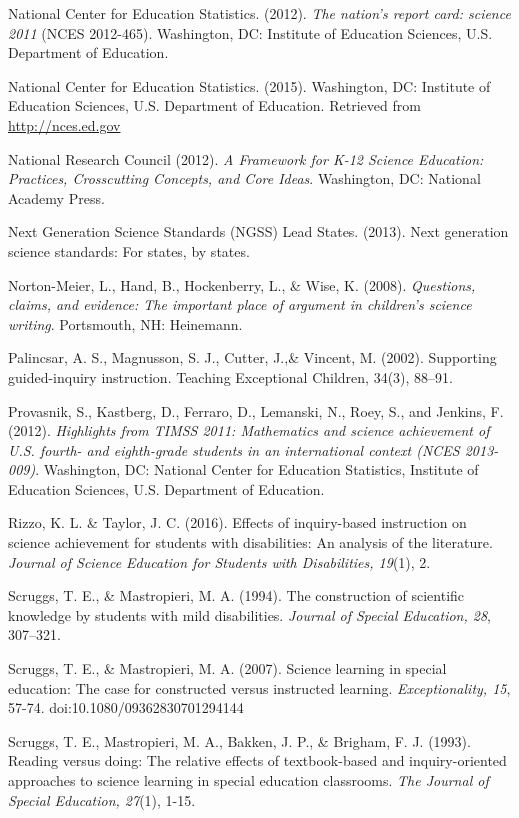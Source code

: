 \documentclass[11.5pt]{sig-alternate} %
\begin{document}
National Center for Education Statistics. (2012). \textit{The nation's report card: science 2011} (NCES 	2012-465).  Washington, DC: Institute of Education Sciences, U.S. Department of Education.

National Center for Education Statistics. (2015). Washington, DC: Institute of Education 	Sciences, U.S. Department of Education. Retrieved from \url{http://nces.ed.gov}

National Research Council (2012). \textit{A Framework for K-12 Science Education: Practices, 	Crosscutting Concepts, and Core Ideas}. Washington, DC: National Academy Press.

Next Generation Science Standards (NGSS) Lead States. (2013). Next generation 	science 	standards: For states, by states.

Norton-Meier, L., Hand, B., Hockenberry, L., \& Wise, K. (2008). \textit{Questions, claims, and 	evidence: The important place of argument in children's science writing}.  Portsmouth, 	NH:  Heinemann.

Palincsar, A. S., Magnusson, S. J., Cutter, J.,\& Vincent, M. (2002). Supporting guided-inquiry instruction. Teaching Exceptional Children, 34(3), 88–91.

Provasnik, S., Kastberg, D., Ferraro, D., Lemanski, N., Roey, S., and Jenkins, F. (2012). \textit{Highlights from TIMSS 2011: Mathematics and science achievement of U.S. fourth- 	and eighth-grade students in an international context (NCES 2013-009)}.  Washington, 	DC: National Center for Education Statistics, Institute of Education Sciences, U.S. 	Department of Education. 

Rizzo, K. L. \& Taylor, J. C. (2016).  Effects of inquiry-based instruction on science 	achievement for students with disabilities: An analysis of the literature.  \textit{Journal of 	Science Education for Students with Disabilities, 19}(1), 2.

Scruggs, T. E., \& Mastropieri, M. A. (1994). The construction of scientific knowledge by 	students with mild disabilities. \textit{Journal of Special Education, 28}, 307–321.

Scruggs, T. E., \& Mastropieri, M. A. (2007).  Science learning in special education: The case for constructed versus instructed learning. \textit{Exceptionality, 15}, 57-74. 	doi:10.1080/09362830701294144

Scruggs, T. E., Mastropieri, M. A., Bakken, J. P., \& Brigham, F. J. (1993). Reading versus 	doing: The relative effects of textbook-based and inquiry-oriented approaches to science 	learning in special education classrooms. \textit{The Journal of Special Education, 27}(1), 1-15.
\end{document}
